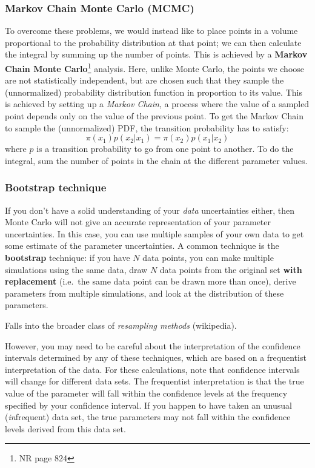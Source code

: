 \documentclass{article}
\newcommand{\mynotes}[1]{%
    \textcolor{myGreen}{\fontfamily{phv}\selectfont #1}
    }
\begin{document}
\subsubsection{Markov Chain Monte Carlo (MCMC)}\label{mcmc}
To overcome these problems, we would instead like to place points in a volume
proportional to the probability distribution at that point; we can then
calculate the integral by summing up the number of points. This is achieved by
a \textbf{Markov Chain Monte Carlo}\footnote{NR page 824} analysis. Here,
unlike Monte Carlo, the points we choose are not statistically independent, but
are chosen such that they sample the (unnormalized) probability distribution
function in proportion to its value. This is achieved by setting up a
\textit{Markov Chain}, a process where the value of a sampled point depends
only on the value of the previous point. To get the Markov Chain to sample the
(unnormalized) PDF, the transition probability has to satisfy:
\[
    \pi \left( x_{1} \right) p \left( x_{2}|x_{1} \right) =
    \pi \left( x_{2} \right) p \left( x_{1}|x_{2} \right)
    \]
where $p$ is a transition probability to go from one point to another.
To do the integral, sum the number of points in the chain at the different
parameter values.

\subsubsection{Bootstrap technique}
If you don't have a solid understanding of your \emph{data} uncertainties
either, then Monte Carlo will not give an accurate
representation of your parameter uncertainties. In this case, you can use
multiple samples of your own data to get some estimate of the parameter
uncertainties. A common technique is the \textbf{bootstrap} technique: if you
have $N$ data points, you can make multiple simulations using the same data,
draw $N$ data points from the original set \textbf{with replacement} (i.e.\ the
same data point can be drawn more than once), derive parameters from multiple
simulations, and look at the distribution of these parameters.

\mynotes{Falls into the broader class of \textit{resampling methods}
    (wikipedia).}

However, you may need to be careful about the interpretation of the confidence
intervals determined by any of these techniques, which are based on a
frequentist interpretation of the data. For these calculations, note that
confidence intervals will change for different data sets. The frequentist
interpretation is that the true value of the parameter will fall within the
confidence levels at the frequency specified by your confidence interval. If
you happen to have taken an unusual (\emph{in}frequent) data set, the true
parameters may not fall within the confidence levels derived from
this data set.
\end{document}
